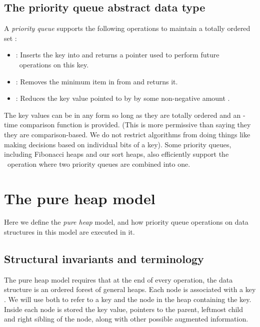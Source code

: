 \begin{fullonly}
\section{The priority queue abstract data type} 

A \emph{priority queue} supports the following operations to maintain a totally ordered set \theset:

\begin{itemize}

\item \opIns: Inserts the key  into  and returns a pointer  used to perform future \opDc\ operations on this key.

\item \opEm: Removes the minimum item in  from  and returns it.

\item \opDc: Reduces the key value pointed to by  by some non-negative amount .

\end{itemize}

The key values can be in any form so long as they are totally ordered and an -time comparison function is provided. (This is more permissive than saying they they are comparison-based. We do not restrict algorithms from doing things like making decisions based on individual bits of a key). Some priority queues, including Fibonacci heaps and our sort heaps, also efficiently support the \opMg\ operation where two priority queues are combined into one.
\end{fullonly}


\section{The pure heap model} 

Here we define the \emph{pure heap} model, and how priority queue operations on data structures in this model are executed in it.

\subsection{Structural invariants and terminology}

The pure heap model requires that at the end of every operation, the data structure is an ordered forest of general heaps. 
Each node is associated with a key . We will use  both to refer to a key and the node in the heap containing the key. Inside each node is stored the key value, pointers to the parent, leftmost child and right sibling of the node, along with other possible augmented information.

